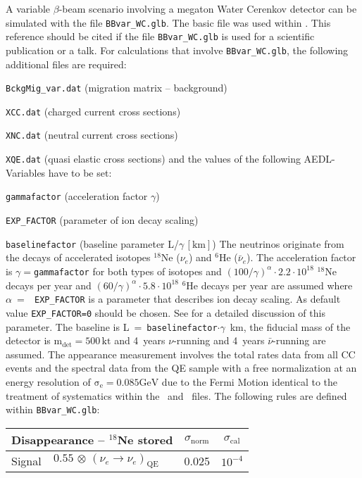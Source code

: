 \begin{appendix}
A variable $\beta$-beam scenario involving a megaton Water Cerenkov detector can be simulated with the file 
{\tt BBvar\_WC.glb}. The basic file was used within \cite{Huber:2005jk}. This reference
should be cited if the file {\tt BBvar\_WC.glb} is used for a scientific publication or a talk. For calculations that
involve {\tt BBvar\_WC.glb}, the following additional files are required:
\bi
\item {\tt BckgMig\_var.dat} (migration matrix -- background)
\item {\tt XCC.dat} (charged current cross sections)
\item {\tt XNC.dat} (neutral current cross sections)
\item {\tt XQE.dat} (quasi elastic cross sections)
\ei
and the values of the following {\sf AEDL}-Variables have to be set:
\bi
\item {\tt gammafactor} (acceleration factor $\gamma$)
\item {\tt EXP\_FACTOR} (parameter of ion decay scaling)
\item {\tt baselinefactor} (baseline parameter L/$\gamma\,\left[\mathrm{km}\right]$)
\ei
The neutrinos originate from the decays of accelerated isotopes $^{18}$Ne ($\nu_e$) and $^6$He ($\bar{\nu}_e$).
The acceleration factor is $\gamma=${\tt gammafactor} for both types of isotopes and
$(100/\gamma)^\alpha\cdot2.2\cdot10^{18}$ $^{18}$Ne decays per
year and $(60/\gamma)^\alpha\cdot5.8\cdot10^{18}$ $^{6}$He decays per year are assumed where $\alpha$~=~{\tt
EXP\_FACTOR} is a parameter that describes ion decay scaling. As default value {\tt EXP\_FACTOR=0} should be chosen.
See \cite{Huber:2005jk} for a detailed discussion of this parameter. The baseline is
L~=~{\tt baselinefactor}$\cdot\gamma$~km, the
fiducial mass of the detector is $\mathrm{m_{det} = 500 \,kt}$ and 4~years $\nu$-running and 4~years
$\bar{\nu}$-running are assumed. The appearance measurement involves the total rates data from all CC events and the spectral data
from the QE sample with a free normalization at an energy resolution of $\mathrm{\sigma_e=0.085GeV}$ due to the
Fermi Motion identical to the treatment of systematics within the \TtoK\ and \TtoHK\ files. The following rules are defined within {\tt BBvar\_WC.glb}:
\begin{center}
\begin{tabular}{|l|ll|c|c|}
\hline \hline
\multicolumn{3}{|l|}{Disappearance -- $^{18}$Ne stored} & $\sigma_\mathrm{norm}$ & $\sigma_\mathrm{cal}$ \\ \hline
Signal & $0.55 \, \otimes \, (\nu_e\rightarrow\nu_e)_{\mathrm{QE}}$ & \hspace{6cm} & 0.025 & $10^{-4}$ \\

\end{tabular}
\end{center}
\end{appendix}
